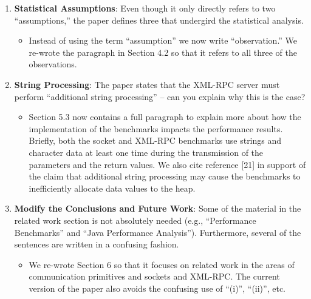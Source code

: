 \documentclass[11pt]{article}
\begin{document}
\begin{enumerate}
\begin{itemize}
    \end{itemize}

  \item {\bf Statistical Assumptions}: Even though it only directly
    refers to two ``assumptions,'' the paper defines three that
    undergird the statistical analysis.

    \begin{itemize}

      \item Instead of using the term ``assumption'' we now write
        ``observation.'' We re-wrote the paragraph in Section
        4.2 so that it refers to all three of the observations.

    \end{itemize}

  \item {\bf String Processing}: The paper states that the XML-RPC
    server must perform ``additional string processing'' -- can you
    explain why this is the case?

    \begin{itemize}

      \item Section 5.3 now contains a full paragraph to explain more
        about how the implementation of the benchmarks impacts the
        performance results.  Briefly, both the socket and XML-RPC
        benchmarks use strings and character data at least one time
        during the transmission of the parameters and the return
        values.  We also cite reference [21] in support of the claim
        that additional string processing may cause the benchmarks to
        inefficiently allocate data values to the heap.

    \end{itemize}

\newpage

  \item {\bf Modify the Conclusions and Future Work}: Some of the
    material in the related work section is not absolutely needed
    (e.g., ``Performance Benchmarks'' and ``Java Performance
    Analysis'').  Furthermore, several of the sentences are written in
    a confusing fashion.

    \begin{itemize}

      \item We re-wrote Section 6 so that it focuses on related work
        in the areas of communication primitives and sockets and
        XML-RPC.  The current version of the paper also avoids the
        confusing use of ``(i)'', ``(ii)'', etc.


\end{itemize}
\end{enumerate}
\end{document}
